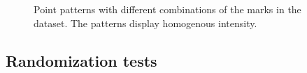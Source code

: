 \documentclass[12pt,a4paper,oneside,article]{memoir}
\begin{document}
\begin{figure}[htb]
  \begin{adjustwidth}{-2in}{-2in}
	  \centering
  \end{adjustwidth}
  \caption{Point patterns with different combinations of the marks in the dataset. The patterns display homogenous intensity.}
  \label{fig:combined_intensities}
\end{figure}

\subsection{Randomization tests}
\end{document}
